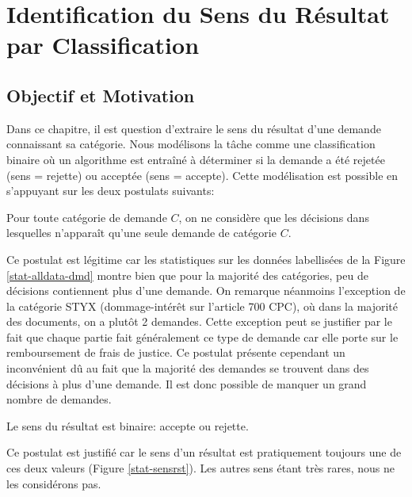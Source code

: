 \chapter{Identification du Sens du Résultat par Classification}
\label{sec:sensresultat}

\section{Objectif et Motivation}
\label{sec:sensresultat:motivation}
Dans ce chapitre, il est question d'extraire le sens du résultat d'une demande connaissant sa catégorie. Nous modélisons la tâche comme une classification binaire où un algorithme est entraîné à déterminer si la demande a été rejetée (sens = rejette) ou acceptée (sens = accepte). Cette modélisation est possible en s'appuyant sur les deux postulats suivants:

\begin{postulat}
Pour toute catégorie de demande $C$, on ne considère que les décisions dans lesquelles n'apparaît qu'une seule demande de catégorie $C$.
\end{postulat} 
Ce postulat est légitime car les statistiques sur les données labellisées de la Figure \ref{stat-alldata-dmd} montre bien que pour la majorité des catégories, peu de décisions contiennent plus d'une demande. On remarque néanmoins l'exception de la catégorie STYX (dommage-intérêt sur l'article 700 CPC), où dans la majorité des documents, on a plutôt 2 demandes. Cette exception peut se justifier par le fait que chaque partie fait généralement ce type de demande car elle porte sur le remboursement de frais de justice. Ce postulat présente cependant un inconvénient dû au fait que la majorité des demandes se trouvent dans des décisions à plus d'une demande. Il est donc possible de manquer un grand nombre de demandes. %

\begin{postulat}
Le sens du résultat est binaire: accepte ou rejette.
\end{postulat} 
Ce postulat est justifié car le sens d'un résultat est pratiquement toujours une de ces deux valeurs (Figure \ref{stat-sensrst}). Les autres sens étant très rares, nous ne les considérons pas.

